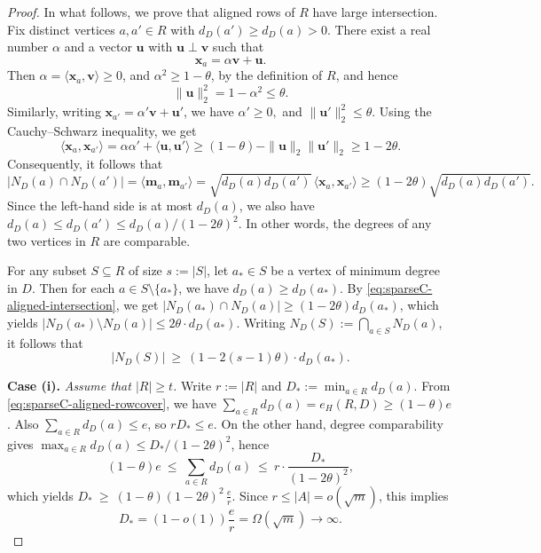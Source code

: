 \documentclass[11pt]{article}
\theoremstyle{definition}
\theoremstyle{plain}
\begin{document}
\begin{proof}
In what follows, we prove that 
aligned rows of $R$ have large intersection. 
Fix distinct vertices $a,a'\in R$ with $d_D(a')\ge d_D(a)>0$. 
There exist a real number $\alpha$ and a vector $\bm{u}$ with $\bm{u}\perp \bm{v}$ such that 
\[
        \bm{x}_a=\alpha \bm{v}+ \bm{u}.
\]
Then $\alpha=\langle \bm{x}_a,\bm v\rangle\ge0$, and $\alpha^2\ge 1-\theta$, by the definition of \(R\), and hence
\[
        \|\bm{u}\|_2^2=1-\alpha^2\le \theta.
\]
Similarly, writing \(\bm{x}_{a'}=\alpha'\bm v+\bm u'\), we have $\alpha'\ge0,$ and $
\|\bm{u}'\|_2^2\le \theta.$
Using the Cauchy--Schwarz inequality, we get 
\begin{equation}
  \langle \bm{x}_a, \bm{x}_{a'} \rangle
  =\alpha\alpha'+\langle \bm{u}, \bm{u}'\rangle
  \ge (1-\theta)-\|\bm{u}\|_2\|\bm{u}'\|_2
  \ge 1-2\theta.
\end{equation}
Consequently, it follows that 
\begin{equation}\label{eq:sparseC-aligned-intersection}
  |N_D(a)\cap N_D(a') |
  =
  \langle \bm{m}_a,\bm{m}_{a'}\rangle
  =
  \sqrt{d_D(a)d_D(a')}\,\langle \bm{x}_a,\bm{x}_{a'}\rangle
  \ge (1-2\theta)\sqrt{d_D(a)d_D(a')}.
\end{equation}
Since the left-hand side is at most $d_D(a)$, we also have $d_D(a)\le d_D(a')\le d_D(a)/(1-2\theta)^2$. In other words, the degrees of any two vertices in $R$ are comparable. 

For any subset $S\subseteq R$ of size $s:=|S|$, let $a_\ast\in S$ be a vertex of minimum degree in $D$. Then for 
each $a\in S\setminus\{a_\ast\}$, we have 
$d_D(a)\ge d_D(a_\ast)$. 
By \eqref{eq:sparseC-aligned-intersection}, we get 
$|N_D(a_\ast) \cap N_D(a)| \ge (1-2\theta)d_D(a_\ast)$, which yields 
$|N_D(a_\ast) \setminus N_D(a)|\le 2\theta \cdot d_D(a_\ast)$.
Writing $N_D(S):=\bigcap_{a\in S}N_D(a)$, it follows that 
\begin{equation}\label{eq:sparseC-aligned-common-neighborhood}
  |N_D(S)|\ \ge\ (1-2(s-1)\theta) \cdot d_D(a_\ast).
\end{equation}

\smallskip
\noindent
{\bf  Case (i).} 
{\it Assume that $|R|\ge t$.}
Write $r:=|R|$ and $D_\ast:=\min_{a\in R}d_D(a)$. 
From \eqref{eq:sparseC-aligned-rowcover}, we have $\sum_{a\in R}d_D(a)=e_H(R,D)\ge (1-\theta)e$.
Also $\sum_{a\in R}d_D(a)\le e$, so $rD_\ast\le e$.
On the other hand, degree comparability gives $\max_{a\in R}d_D(a)\le D_\ast/(1-2\theta)^2$, hence
\[
  (1-\theta)e\ \le\ \sum_{a\in R}d_D(a)\ \le\ r\cdot \frac{D_\ast}{(1-2\theta)^2},
\]
which yields $D_\ast\ \ge\ (1-\theta)(1-2\theta)^2\,\frac{e}{r}.$
Since $r\le |A|=o(\sqrt{m})$, this implies 
\[
        D_\ast = (1-o(1)) \frac{e}{r}= \Omega (\sqrt{m}) \to\infty.
\]


\end{proof}
\end{document}
